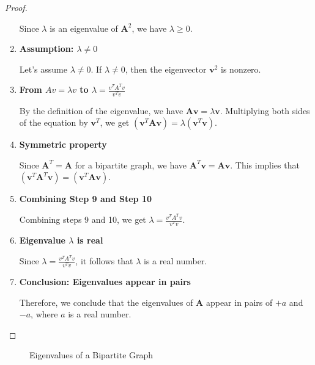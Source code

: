 \documentclass{article}
\newcommand{\vect}[1]{\mathbf{#1}}
\newcommand{\mat}[1]{\mathbf{#1}}
\begin{document}
\begin{proof}
\begin{enumerate}[label=\textbf{Step \arabic*:}, wide=0pt, leftmargin=!, itemindent=2em]
    Since $\lambda$ is an eigenvalue of $\mat{A}^2$, we have $\lambda \geq 0$.
    
    \item \textbf{Assumption: $\lambda \neq 0$}
    
    Let's assume $\lambda \neq 0$. If $\lambda \neq 0$, then the eigenvector $\vect{v}^2$ is nonzero.
    
    \item \textbf{From $Av = \lambda v$ to $\lambda = \frac{v^TA^Tv}{v^Tv}$}
    
    By the definition of the eigenvalue, we have $\mat{A}\vect{v} = \lambda\vect{v}$. Multiplying both sides of the equation by $\vect{v}^T$, we get $(\vect{v}^T\mat{A}\vect{v}) = \lambda(\vect{v}^T\vect{v})$.
    
    \item \textbf{Symmetric property}
    
    Since $\mat{A}^T = \mat{A}$ for a bipartite graph, we have $\mat{A}^T\vect{v} = \mat{A}\vect{v}$. This implies that $(\vect{v}^T\mat{A}^T\vect{v}) = (\vect{v}^T\mat{A}\vect{v})$.
    
    \item \textbf{Combining Step 9 and Step 10}
    
    Combining steps 9 and 10, we get $\lambda = \frac{v^TA^Tv}{v^Tv}$.
    
    \item \textbf{Eigenvalue $\lambda$ is real}
    
    Since $\lambda = \frac{v^TA^Tv}{v^Tv}$, it follows that $\lambda$ is a real number.
    
    \item \textbf{Conclusion: Eigenvalues appear in pairs}
    
    Therefore, we conclude that the eigenvalues of $\mat{A}$ appear in pairs of $+a$ and $-a$, where $a$ is a real number.
\end{enumerate}

\end{proof}

\begin{figure}[htbp]
  \centering
  \caption{Eigenvalues of a Bipartite Graph}
  \label{fig:eigenvalues}
\end{figure}
\end{document}
